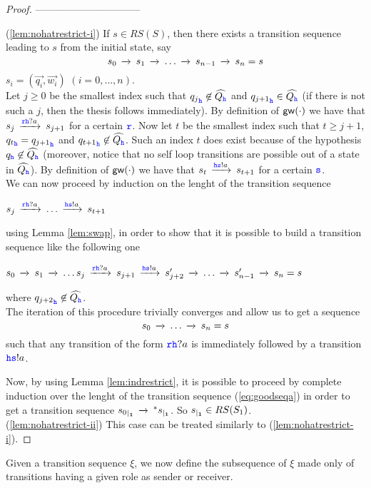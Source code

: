 \begin{proof}
--------------------------------         

(\ref{lem:nohatrestrict-i})
If $s \in RS(S)$, then there exists a transition sequence leading to $s$ from the initial state, say
$$s_0\,\xrightarrow{}_{{}}\,s_1\,\xrightarrow{}_{{}}\, \ldots\,\xrightarrow{}_{{}}\, s_{n-1}\,\xrightarrow{}_{{}}\,s_n=s$$
$s_i = (\vec{q_i},\vec{w_i})$ $(i=0,\ldots,n)$.\\
Let $j \geq 0$ be the smallest index such that ${q_j}_{\mathtt{\color{blue}{ {h}}}}\not\in \widehat{Q_{\mathtt{\color{blue}{ {h}}}}}$ and  ${q_{j+1}}_{\mathtt{\color{blue}{ {h}}}}\in \widehat{Q_{\mathtt{\color{blue}{ {h}}}}}$
(if there is not such a $j$, then the thesis follows immediately).
By definition of $\mathsf{gw}(\cdot)$ we have that $s_j\,\xrightarrow{{\mathtt{\color{blue}{ {r}}}}{\mathtt{\color{blue}{ {h}}}}?a}_{{}}\, s_{j+1}$ for a certain ${\mathtt{\color{blue}{ {r}}}}$.
Now let $t$ be the smallest index such that  $t\geq j+1$, ${q_t}_{\mathtt{\color{blue}{ {h}}}} = {q_{j+1}}_{\mathtt{\color{blue}{ {h}}}}$ and ${q_{t+1}}_{\mathtt{\color{blue}{ {h}}}}\not\in \widehat{Q_{\mathtt{\color{blue}{ {h}}}}}$.
Such an index $t$ does exist because of the hypothesis $q_{\mathtt{\color{blue}{ {h}}}}\not\in\widehat{Q_{\mathtt{\color{blue}{ {h}}}}}$
(moreover, notice that no self loop transitions are possible out of a state in $\widehat{Q_{\mathtt{\color{blue}{ {h}}}}}$).
By definition of $\mathsf{gw}(\cdot)$ we have that $s_{t}\,\xrightarrow{{\mathtt{\color{blue}{ {h}}}}{\mathtt{\color{blue}{ {s}}}}!a}_{{}}\, s_{t+1}$ for a certain ${\mathtt{\color{blue}{ {s}}}}$.\\
We can now proceed by induction on the lenght of the transition sequence
\centerline{
$s_j\,\xrightarrow{{\mathtt{\color{blue}{ {r}}}}{\mathtt{\color{blue}{ {h}}}}?a}_{{}}\, \ldots \,\xrightarrow{{\mathtt{\color{blue}{ {h}}}}{\mathtt{\color{blue}{ {s}}}}!a}_{{}}\,s_{t+1}$
}
using Lemma \ref{lem:swap}, in order to show that 
it is possible to build a transition sequence like the following one\\
\centerline{
$s_0\,\xrightarrow{}_{{}}\,s_1\,\xrightarrow{}_{{}}\,\ldots s_j\,\xrightarrow{{\mathtt{\color{blue}{ {r}}}}{\mathtt{\color{blue}{ {h}}}}?a}_{{}}\, s_{j+1}\,\xrightarrow{{\mathtt{\color{blue}{ {h}}}}{\mathtt{\color{blue}{ {s}}}}!a}_{{}}\, s'_{j+2} \,\xrightarrow{}_{{}}\, \ldots \,\xrightarrow{}_{{}}\,s'_{n-1}\,\xrightarrow{}_{{}}\,s_n=s$
}
where ${q_{j+2}}_{\mathtt{\color{blue}{ {h}}}}\not\in \widehat{Q_{\mathtt{\color{blue}{ {h}}}}}$.\\
The iteration of this procedure trivially converges and allow us to get a sequence
\\
\begin{equation}
\label{eq:goodseqa}
s_0\lts{}\ldots  \lts{}s_n=s
\end{equation}
such that any transition of the form ${\mathtt{\color{blue}{ {r}}}}{\mathtt{\color{blue}{ {h}}}}?a$ is immediately followed by a transition ${\mathtt{\color{blue}{ {h}}}}{\mathtt{\color{blue}{ {s}}}}!a$.

Now, by using Lemma \ref{lem:indrestrict}, it is possible to proceed by complete induction over the 
lenght of the transition sequence (\ref{eq:goodseqa})
in order to get a transition sequence ${s_0}_{\mid_{\mathbf{1}}} \,\xrightarrow{}_{{}}\,^* {s}_{\mid_{\mathbf{1}}}$. So ${s}_{\mid_{\mathbf{1}}}\in RS(S_1)$.\\
(\ref{lem:nohatrestrict-ii}) This case can be treated similarly to (\ref{lem:nohatrestrict-i}).
\end{proof}


Given a transition sequence $\xi$, we now define the subsequence of $\xi$ made only
of transitions having a given role as
sender or receiver.


